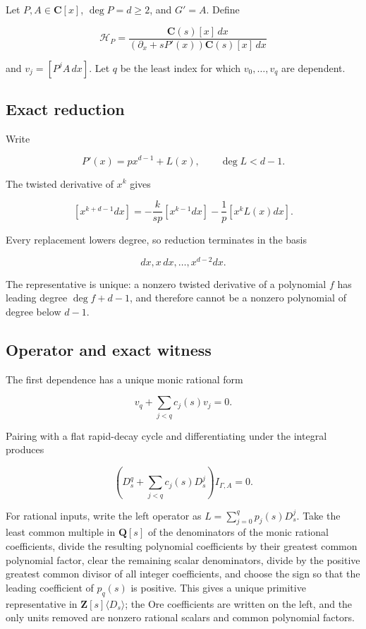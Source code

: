 \documentclass[
  11pt,
  a4paper,
]{amsart}
\begin{document}
Let \(P,A\in\mathbf C[x]\), \(\deg P=d\ge2\), and \(G'=A\). Define

\[
\mathcal H_P=
\frac{\mathbf C(s)[x]\,dx}
     {(\partial_x+sP'(x))\mathbf C(s)[x]\,dx}
\]

and \(v_j=[P^jA\,dx]\). Let \(q\) be the least index for which
\(v_0,\ldots,v_q\) are dependent.

\subsection{Exact reduction}

Write

\[
P'(x)=p x^{d-1}+L(x),\qquad \deg L<d-1.
\]

The twisted derivative of \(x^k\) gives

\[
[x^{k+d-1}dx]
=-\frac{k}{sp}[x^{k-1}dx]
-\frac1p[x^kL(x)dx].                                   \tag{5.1}
\]

Every replacement lowers degree, so reduction terminates in the basis

\[
dx,x\,dx,\ldots,x^{d-2}dx.
\]

The representative is unique: a nonzero twisted derivative of a
polynomial \(f\) has leading degree \(\deg f+d-1\), and therefore cannot
be a nonzero polynomial of degree below \(d-1\).

\subsection{Operator and exact witness}

The first dependence has a unique monic rational form

\[
v_q+\sum_{j<q}c_j(s)v_j=0.
\]

Pairing with a flat rapid-decay cycle and differentiating under the
integral produces

\[
\left(D_s^q+\sum_{j<q}c_j(s)D_s^j\right)I_{\Gamma,A}=0.
\]

For rational inputs, write the left operator as
\(L=\sum_{j=0}^qp_j(s)D_s^j\). Take the least common multiple in
\(\mathbf Q[s]\) of the denominators of the monic rational coefficients,
divide the resulting polynomial coefficients by their greatest common
polynomial factor, clear the remaining scalar denominators, divide by
the positive greatest common divisor of all integer coefficients, and
choose the sign so that the leading coefficient of \(p_q(s)\) is
positive. This gives a unique primitive representative in
\(\mathbf Z[s]\langle D_s\rangle\); the Ore coefficients are written on
the left, and the only units removed are nonzero rational scalars and
common polynomial factors.
\end{document}
